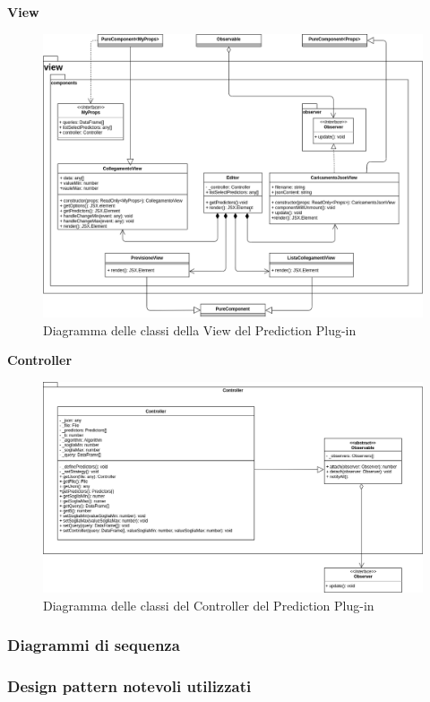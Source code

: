 \textbf{View}
\begin{figure}[H]
\centering
\includegraphics[scale=0.4]{../../Diagrams/Classes_diagrams/plugin_view.png}
\caption{Diagramma delle classi della View del Prediction Plug-in}
\end{figure}

\textbf{Controller}
\begin{figure}[H]
\centering
\includegraphics[scale=0.4]{../../Diagrams/Classes_diagrams/plugin_controller.png}
\caption{Diagramma delle classi del Controller del Prediction Plug-in}
\end{figure}

\subsubsection{Diagrammi di sequenza}

\subsubsection{Design pattern notevoli utilizzati}

